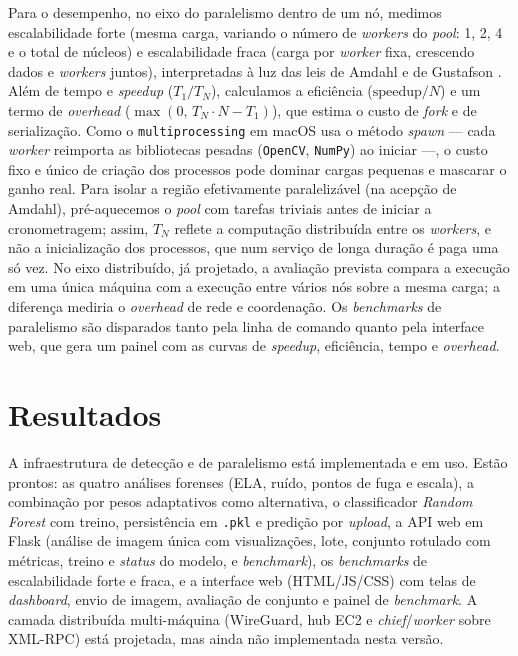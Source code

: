 \documentclass[12pt]{article}
\begin{document}
Para o desempenho, no eixo do paralelismo dentro de um nó, medimos escalabilidade
forte (mesma carga, variando o número de \textit{workers} do \textit{pool}: 1, 2,
4 e o total de núcleos) e escalabilidade fraca (carga por \textit{worker} fixa,
crescendo dados e \textit{workers} juntos), interpretadas à luz das leis de Amdahl
\cite{amdahl1967} e de Gustafson \cite{gustafson1988}. Além de tempo e
\textit{speedup} ($T_1/T_N$), calculamos a eficiência ($\text{speedup}/N$) e um
termo de \textit{overhead} ($\max(0,\, T_N \cdot N - T_1)$), que estima o custo de
\textit{fork} e de serialização. Como o \texttt{multiprocessing} em macOS usa o
método \textit{spawn} --- cada \textit{worker} reimporta as bibliotecas pesadas
(\texttt{OpenCV}, \texttt{NumPy}) ao iniciar ---, o custo fixo e único de criação
dos processos pode dominar cargas pequenas e mascarar o ganho real. Para isolar a
região efetivamente paralelizável (na acepção de Amdahl), pré-aquecemos o
\textit{pool} com tarefas triviais antes de iniciar a cronometragem; assim, $T_N$
reflete a computação distribuída entre os \textit{workers}, e não a inicialização
dos processos, que num serviço de longa duração é paga uma só vez. No eixo
distribuído, já projetado, a avaliação
prevista compara a execução em uma única máquina com a execução entre vários nós
sobre a mesma carga; a diferença mediria o \textit{overhead} de rede e
coordenação. Os \textit{benchmarks} de paralelismo são disparados tanto pela linha
de comando quanto pela interface web, que gera um painel com as curvas de
\textit{speedup}, eficiência, tempo e \textit{overhead}.

\section{Resultados}

A infraestrutura de detecção e de paralelismo está implementada e em uso. Estão
prontos: as quatro análises forenses (ELA, ruído, pontos de fuga e escala), a
combinação por pesos adaptativos como alternativa, o classificador \textit{Random
Forest} com treino, persistência em \texttt{.pkl} e predição por \textit{upload},
a API web em Flask (análise de imagem única com visualizações, lote, conjunto
rotulado com métricas, treino e \textit{status} do modelo, e \textit{benchmark}),
os \textit{benchmarks} de escalabilidade forte e fraca, e a interface web
(HTML/JS/CSS) com telas de \textit{dashboard}, envio de imagem, avaliação de
conjunto e painel de \textit{benchmark}. A camada distribuída multi-máquina
(WireGuard, hub EC2 e \textit{chief}/\textit{worker} sobre XML-RPC) está projetada,
mas ainda não implementada nesta versão.
\end{document}
